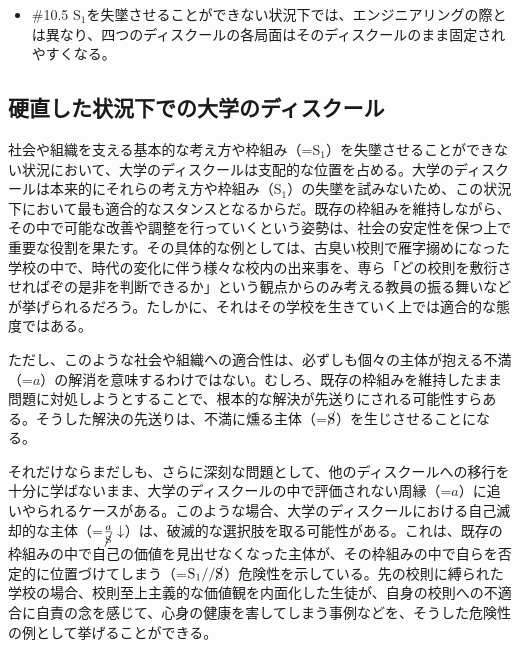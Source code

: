 \begin{note}{}
  \begin{itemize}
    \tightlist
    \item{\#10.5} $\textrm{S}_1$を失墜させることができない状況下では、エンジニアリングの際とは異なり、四つのディスクールの各局面はそのディスクールのまま固定されやすくなる。
  \end{itemize}
\end{note}

\subsection{硬直した状況下での大学のディスクール}\label{ux786cux76f4ux3057ux305fux72b6ux6cc1ux4e0bux3067ux306eux5927ux5b66ux306eux30c7ux30a3ux30b9ux30afux30fcux30eb}

社会や組織を支える基本的な考え方や枠組み（=\(\textrm{S}_1\)）を失墜させることができない状況において、大学のディスクールは支配的な位置を占める。大学のディスクールは本来的にそれらの考え方や枠組み（\(\textrm{S}_1\)）の失墜を試みないため、この状況下において最も適合的なスタンスとなるからだ。既存の枠組みを維持しながら、その中で可能な改善や調整を行っていくという姿勢は、社会の安定性を保つ上で重要な役割を果たす。その具体的な例としては、古臭い校則で雁字搦めになった学校の中で、時代の変化に伴う様々な校内の出来事を、専ら「どの校則を敷衍させればぞの是非を判断できるか」という観点からのみ考える教員の振る舞いなどが挙げられるだろう。たしかに、それはその学校を生きていく上では適合的な態度ではある。

ただし、このような社会や組織への適合性は、必ずしも個々の主体が抱える不満（=\(a\)）の解消を意味するわけではない。むしろ、既存の枠組みを維持したまま問題に対処しようとすることで、根本的な解決が先送りにされる可能性すらある。そうした解決の先送りは、不満に燻る主体（=\(\cancel{\textrm{S}}\)）を生じさせることになる。

それだけならまだしも、さらに深刻な問題として、他のディスクールへの移行を十分に学ばないまま、大学のディスクールの中で評価されない周縁（=\(a\)）に追いやられるケースがある。このような場合、大学のディスクールにおける自己滅却的な主体（=\(\frac{a}{\cancel{\textrm{S}}}\downarrow\)）は、破滅的な選択肢を取る可能性がある。これは、既存の枠組みの中で自己の価値を見出せなくなった主体が、その枠組みの中で自らを否定的に位置づけてしまう（=\(\textrm{S}_1//\cancel{\textrm{S}}\)）危険性を示している。先の校則に縛られた学校の場合、校則至上主義的な価値観を内面化した生徒が、自身の校則への不適合に自責の念を感じて、心身の健康を害してしまう事例などを、そうした危険性の例として挙げることができる。


